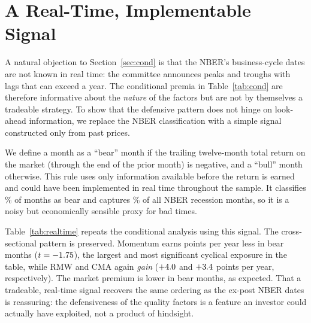 \documentclass[12pt]{article}
\begin{document}
\section{A Real-Time, Implementable Signal}
\label{sec:realtime}

A natural objection to Section~\ref{sec:cond} is that the NBER's business-cycle
dates are not known in real time: the committee announces peaks and troughs with
lags that can exceed a year. The conditional premia in Table~\ref{tab:cond} are
therefore informative about the \emph{nature} of the factors but are not by
themselves a tradeable strategy. To show that the defensive pattern does not
hinge on look-ahead information, we replace the NBER classification with a simple
signal constructed only from past prices.

We define a month as a ``bear'' month if the trailing twelve-month total return
on the market (through the end of the prior month) is negative, and a ``bull''
month otherwise. This rule uses only information available before the return is
earned and could have been implemented in real time throughout the sample. It
classifies \bearFrac\% of months as bear and captures \bearOverlap\% of all NBER
recession months, so it is a noisy but economically sensible proxy for bad
times.

Table~\ref{tab:realtime} repeats the conditional analysis using this signal.
The cross-sectional pattern is preserved. Momentum earns \momBearDiff{} points
per year less in bear months ($t=-1.75$), the largest and most significant
cyclical exposure in the table, while RMW and CMA again \emph{gain}
($+4.0$ and $+3.4$ points per year, respectively). The market
premium is lower in bear months, as expected. That a tradeable, real-time signal
recovers the same ordering as the ex-post NBER dates is reassuring: the
defensiveness of the quality factors is a feature an investor could actually
have exploited, not a product of hindsight.

\begin{table}[t]
\centering
\caption{\textbf{Factor performance under a real-time bear-market signal.} A
month is classified ``bear'' if the trailing twelve-month total market return
(through the prior month) is negative, using only ex-ante information. The table
reports annualized mean premia (\%) in bull and bear months, their difference
with the Newey--West $t$-statistic in parentheses. $^{*}$, $^{**}$, $^{***}$
denote significance at the 10\%, 5\%, and 1\% levels.}
\label{tab:realtime}
\small

\end{table}
\end{document}
